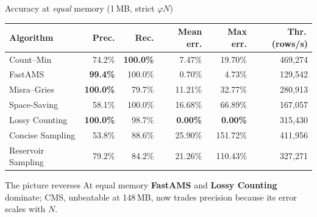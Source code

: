 \documentclass[11pt,aspectratio=169]{beamer}
\begin{document}
\begin{frame}{Accuracy at \emph{equal} memory (1\,MB, strict $\varphi N$)}
  \centering
  \scriptsize
  \renewcommand{\arraystretch}{1.15}
  \begin{tabular}{lrrrrr}
    \toprule
    \textbf{Algorithm} & \textbf{Prec.} & \textbf{Rec.} & \textbf{Mean err.} & \textbf{Max err.} & \textbf{Thr.\,(rows/s)} \\
    \midrule
    Count--Min         & 74.2\% & \textbf{100.0\%} & 7.47\%  & 19.70\%  & 469{,}274 \\
    FastAMS            & \textbf{99.4\%} & 100.0\% & 0.70\%  & 4.73\%   & 129{,}542 \\
    Misra--Gries       & \textbf{100.0\%}& 79.7\%  & 11.21\% & 32.77\%  & 280{,}913 \\
    Space-Saving       & 58.1\% & 100.0\% & 16.68\% & 66.89\%  & 167{,}057 \\
    Lossy Counting     & \textbf{100.0\%}& 98.7\%  & \textbf{0.00\%}  & \textbf{0.00\%} & 315{,}430 \\
    Concise Sampling   & 53.8\% & 88.6\%  & 25.90\% & 151.72\% & 411{,}956 \\
    Reservoir Sampling & 79.2\% & 84.2\%  & 21.26\% & 110.43\% & 327{,}271 \\
    \bottomrule
  \end{tabular}

  \vspace{0.7em}
  \begin{alertblock}{The picture reverses}
    At equal memory \textbf{FastAMS} and \textbf{Lossy Counting} dominate; CMS,
    unbeatable at 148\,MB, now trades precision because its error scales with $N$.
  \end{alertblock}
\end{frame}
\end{document}
